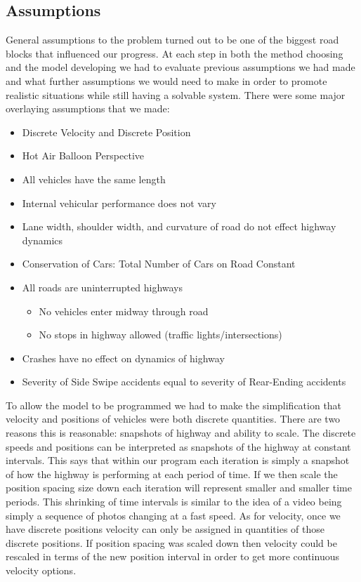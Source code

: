 \documentclass{amsart}
\begin{document}
	\subsection{Assumptions}
		General assumptions to the problem turned out to be one of the biggest road blocks that influenced our progress.  At each step in both the method choosing and the model developing we had to evaluate previous assumptions we had made and what further assumptions we would need to make in order to promote realistic situations while still having a solvable system.  There were some major overlaying assumptions that we made:
		\begin{itemize}
			\item  	Discrete Velocity and Discrete Position
			\item  Hot Air Balloon Perspective
			\item 	All vehicles have the same length 
			\item 	Internal vehicular performance does not vary
			\item  Lane width, shoulder width, and curvature of road do not effect highway dynamics
			\item 	Conservation of Cars: Total Number of Cars on Road Constant
			
			\item  	All roads are uninterrupted highways
				\begin{itemize}
					\item 	No vehicles enter midway through road
					\item 	No stops in highway allowed (traffic lights/intersections) 
				\end{itemize}
			\item   Crashes have no effect on dynamics of highway
			\item 	Severity of Side Swipe accidents equal to severity of Rear-Ending accidents			
		\end{itemize}
		 

		To allow the model to be programmed we had to make the simplification that velocity and positions of vehicles were both discrete quantities.  There are two reasons this is reasonable: snapshots of highway and ability to scale.  The discrete speeds and positions can be interpreted as snapshots of the highway at constant intervals.  This says that within our program each iteration is simply a snapshot of how the highway is performing at each period of time.  If we then scale the position spacing size down each iteration will represent smaller and smaller time periods.  This shrinking of time intervals is similar to the idea of a video being simply a sequence of photos changing at a fast speed.  As for velocity, once we have discrete positions velocity can only be assigned in quantities of those discrete positions.  If position spacing was scaled down then velocity could be rescaled in terms of the new position interval in order to get more continuous velocity options. 
	
\end{document}
